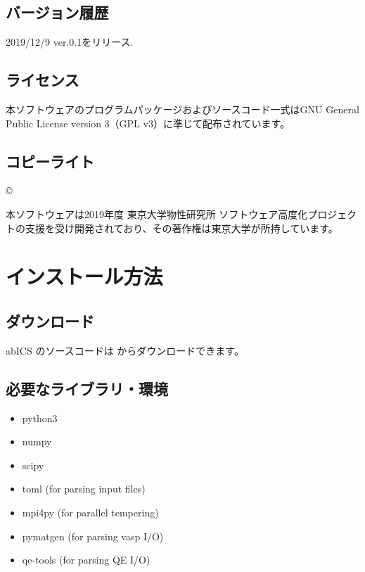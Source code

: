 \documentclass[letterpaper,10pt,dvipdfmx]{sphinxmanual}
\begin{document}
\section{バージョン履歴}
\label{\detokenize{about/info:id3}}
2019/12/9 ver.0.1をリリース.


\section{ライセンス}
\label{\detokenize{about/info:id4}}
本ソフトウェアのプログラムパッケージおよびソースコード一式はGNU General Public License version 3（GPL v3）に準じて配布されています。


\section{コピーライト}
\label{\detokenize{about/info:id5}}
© 

本ソフトウェアは2019年度 東京大学物性研究所 ソフトウェア高度化プロジェクトの支援を受け開発されており、その著作権は東京大学が所持しています。


\chapter{インストール方法}
\label{\detokenize{install/index::doc}}\label{\detokenize{install/index:id1}}

\section{ダウンロード}
\label{\detokenize{install/install::doc}}\label{\detokenize{install/install:id1}}
abICS のソースコードは  からダウンロードできます。



\section{必要なライブラリ・環境}
\label{\detokenize{install/install:id2}}\begin{itemize}
\item {} 
python3

\item {} 
numpy

\item {} 
scipy

\item {} 
toml (for parsing input files)

\item {} 
mpi4py (for parallel tempering)

\item {} 
pymatgen (for parsing vasp I/O)

\item {} 
qe-tools (for parsing QE I/O)

\end{itemize}
\end{document}
